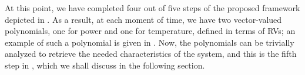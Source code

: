 At this point, we have completed four out of five steps of the proposed framework depicted in . As a result, at each moment of time, we have two vector-valued polynomials, one for power and one for temperature, defined in terms of RVs; an example of such a polynomial is given in . Now, the polynomials can be trivially analyzed to retrieve the needed characteristics of the system, and this is the fifth step in , which we shall discuss in the following section.
